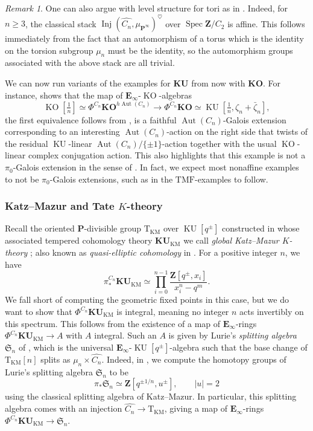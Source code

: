 \documentclass[11pt, a4paper]{article}
\newcommand{\km}{{\mathrm{KM}}}
\newcommand{\KM}{\km}
\DeclareMathOperator{\Spec}{Spec}
\newcommand{\1}{\mathbf{1}}
\DeclareMathOperator{\KU}{KU}
\newcommand{\gKU}{{\mathbf{KU}}}
\newcommand{\gKO}{{\mathbf{KO}}}
\DeclareMathOperator{\KO}{KO}
\newcommand{\TMF}{\mathrm{TMF}}
\DeclareMathOperator{\Inj}{Inj}
\DeclareMathOperator{\Aut}{Aut}
\newcommand{\dual}[1]{{\widehat{#1}}}
\newcommand{\E}{\mathbf{E}}
\renewcommand{\P}{\mathbf{P}}
\newcommand{\T}{\mathrm{T}}
\newcommand{\Z}{\mathbf{Z}}
\theoremstyle{plain}
\theoremstyle{definition}
\theoremstyle{remark}\numberwithin{equation}{section}
\newtheorem{remark}[equation]{Remark}
\begin{document}
\begin{remark}
    One can also argue with level structure for tori as in \cite{km}. Indeed, for $n\geq 3$, the classical stack $\Inj(\dual{C_n}, \mu_{\P^{\infty}})^\heartsuit$ over $\Spec \Z/C_2$ is affine. This follows immediately from the fact that an automorphism of a torus which is the identity on the torsion subgroup $\mu_n$ must be the identity, so the automorphism groups associated with the above stack are all trivial.
\end{remark}

We can now run variants of the examples for $\gKU$ from  now with $\gKO$. For instance,  shows that the map of $\E_\infty$-$\KO$-algebras
\[\KO[\tfrac{1}{n}] \simeq \Phi^{C_n} \gKO^{h\Aut(C_n)} \to \Phi^{C_n} \gKO \simeq \KU[\tfrac{1}{n}, \zeta_n + \bar{\zeta}_n],\]
the first equivalence follows from , is a faithful $\Aut(C_n)$-Galois extension corresponding to an interesting $\Aut(C_n)$-action on the right side that twists of the residual $\KU$-linear $\Aut(C_n)/\{\pm 1\}$-action together with the usual $\KO$-linear complex conjugation action. This also highlights that this example is not a $\pi_0$-Galois extension in the sense of . In fact, we expect most nonaffine examples to not be $\pi_0$-Galois extensions, such as in the $\TMF$-examples to follow.

\subsubsection{Katz--Mazur and Tate \texorpdfstring{$K$}{K}-theory}
Recall the oriented $\P$-divisible group $\T_\KM$ over $\KU[q^\pm]$ constructed in \cite[Thm.4.1]{globaltate} whose associated tempered cohomology theory $\gKU_\KM$ we call \emph{global Katz--Mazur $K$-theory} \cite[Ex.5.1.6]{temperedglobal}; also known as \emph{quasi-elliptic cohomology} in \cite{globaltate,quasielliptic}. For a positive integer $n$, we have
\[\pi_\ast^{C_n} \gKU_\KM \simeq \prod_{i=0}^{n-1} \frac{\Z[q^\pm, x_i]}{x_i^n-q^m}.\]
We fall short of computing the geometric fixed points in this case, but we do want to show that $\Phi^{C_n} \gKU_\KM$ is integral, meaning no integer $n$ acts invertibly on this spectrum. This follows from the existence of a map of $\E_\infty$-rings $\Phi^{C_n} \gKU_\KM \to A$ with $A$ integral. Such an $A$ is given by Lurie's \emph{splitting algebra} $\mathfrak{S}_n$ of \cite[]{ec3}, which is the universal $\E_\infty$-$\KU[q^\pm]$-algebra such that the base change of $\T_\KM[n]$ splits as $\mu_{n} \times \dual{C_n}$. Indeed, in \cite[Lm.7.27]{globaltate}, we compute the homotopy groups of Lurie's splitting algebra $\mathfrak{S}_n$ to be
\[\pi_\ast \mathfrak{S}_n \simeq \Z[q^{\pm1/n}, u^\pm], \qquad |u|=2\]
using the classical splitting algebra of Katz--Mazur. In particular, this splitting algebra comes with an injection $\dual{C_n} \to \T_\KM$, giving a map of $\E_\infty$-rings $\Phi^{C_n} \gKU_\KM \to \mathfrak{S}_n$.
\end{document}
